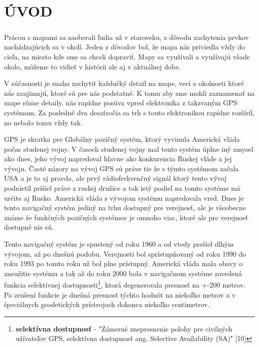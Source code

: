 \chapter*{ÚVOD}
\paragraph{} 
Prácou s mapami sa zaoberali ľudia už v staroveku, z dôvodu zachytenia prvkov nachádzajúcich sa v okolí. Jeden z dôvodov bol, že mapa nás priviedla vždy do cieľa, na miesto kde sme sa chceli dopraviť. Mapy sa využívali a využívajú všade okolo, môžeme to vidieť v histórii ale aj v aktuálnej dobe.

V súčasnosti je snaha zachytiť každučký detail na mape, vecí a okolnosti ktoré nás zaujímajú, ktoré sú pre nás podstatné. K tomu aby sme mohli zaznamenať na mape rôzne detaily, nás rapídne posúva vpred elektronika z takzvaným GPS systémom. Za posledné dva desaťročia sa trh s touto elektronikou rapídne rozšíril, no nebolo tomu vždy tak. 

GPS je skratka pre Globálny pozičný systém, ktorý vyvinula Americká vláda počas studenej vojny. V časoch studenej vojny mal tento systém úplne iný zmysel ako dnes, jeho vývoj napredoval hlavne ako konkurencia Ruskej vláde a jej vývoju. Časté názory na vývoj GPS sú práve tie že s týmto systémom začala USA a je to aj pravda, ale prvý rádiofrekvenčný signál ktorý tento vývoj podnietil prišiel práve z ruskej družice a tak istý podiel na tomto systéme má určite aj Rusko. Americká vláda s vývojom systému napredovala vred. Dnes je tento navigačný systém jediný na trhu dostupný pre verejnosť, ale je všeobecne známe že funkčných pozičných systémov je omnoho viac, ktoré ale pre verejnosť dostupné nie sú. 

Tento navigačný systém je spustený od roku 1960 a od vtedy prešiel dlhým vývojom, až po dnešnú podobu. Verejnosti bol sprístupňovaný od roku 1990 do roku 1993 po tomto roku už bol plne prístupný. Americká vláda mala obavy o zneužitie systému a tak až do roku 2000 bola v navigačnom systéme zavedená funkcia selektívnej dostupnosti\footnote{\textbf{selektívna dostupnosť} - "Zámerné znepresnenie polohy pre civilných užívateľov GPS, selektívna dostupnosť ang. Selective Availability (SA)" [10]}, ktorá degenerovala presnosť na +-200 metrov. Po zrušení funkcie je dnešná presnosť týchto hodnôt na niekoľko metrov a v špeciálnych geodetických prístrojoch dokonca niekoľko centimetrov. 

